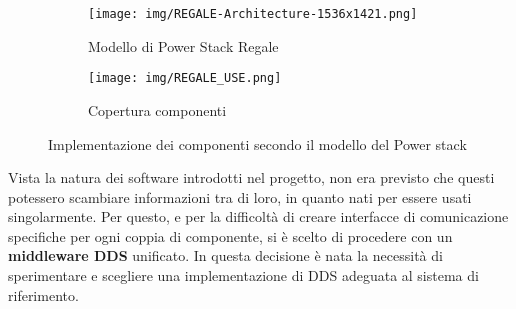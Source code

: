 \begin{figure}[H]
    \centering
    \begin{subfigure}[b]{0.50\textwidth}
    \texttt{[image: img/REGALE-Architecture-1536x1421.png]}
    \caption{Modello di Power Stack Regale}\label{fig:powerstackscheme}
    \end{subfigure}
    \hfill
    \begin{subfigure}[b]{0.50\textwidth}
    \texttt{[image: img/REGALE\_USE.png]}
    \caption{Copertura componenti}\label{fig:regale_cover}
    \end{subfigure}
    \caption{Implementazione dei componenti secondo il modello del Power stack}
\end{figure}
Vista la natura dei software introdotti nel progetto, non era previsto che questi potessero scambiare informazioni tra di loro, in quanto nati per essere usati singolarmente. Per questo, e per la difficoltà di creare interfacce di comunicazione specifiche per ogni coppia di componente, si è scelto di procedere con un \textbf{middleware DDS} unificato. In questa decisione è nata la necessità di sperimentare e scegliere una implementazione di DDS adeguata al sistema di riferimento. %
